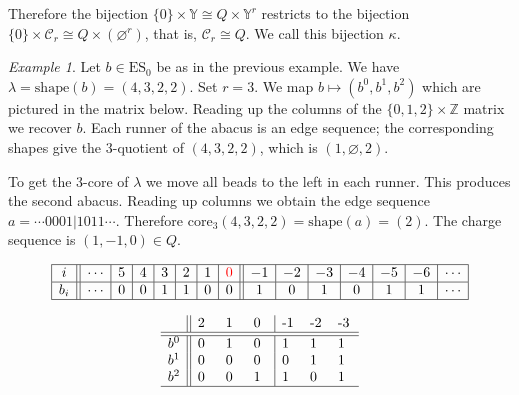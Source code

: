 \documentclass{amsart}
\newcommand{\Z}{\mathbb{Z}}
\newcommand{\Y}{\mathbb{Y}}
\newcommand{\cC}{\mathcal{C}}
\newcommand{\kb}{\kappa}
\newcommand{\la}{\lambda}
\newcommand{\core}{\mathrm{core}}
\newcommand{\ES}{\mathrm{ES}}
\newcommand{\shape}{\mathrm{shape}}
\theoremstyle{remark}
\newtheorem{ex}[thm]{Example}
\numberwithin{thm}{section}
\numberwithin{equation}{section}
\begin{document}
Therefore the bijection $\{0\} \times\Y \cong Q\times\Y^r$ restricts to the bijection
$\{0\} \times \cC_r \cong Q \times (\varnothing^r)$, that is, $\cC_r\cong Q$. We call this bijection $\kb$.

\begin{ex}\label{X:core-quot}
Let $b\in \ES_0$ be as in the previous example. We have $\la=\shape(b)=(4,3,2,2)$. Set $r=3$. 
We map $b\mapsto (b^0,b^1,b^2)$ which are pictured in the matrix below.
Reading up the columns of the $\{0,1,2\}\times \Z$ matrix we recover $b$. 
Each runner of the abacus is an edge sequence; the corresponding shapes give the $3$-quotient of $(4,3,2,2)$, which is
$(1,\varnothing,2)$.

To get the $3$-core of $\la$ we move all beads to the left in each runner. This produces the second abacus. 
Reading up columns we obtain the edge sequence $a=\dotsm 0001|1011\dotsm$. Therefore $\core_3(4,3,2,2)=\shape(a)=(2)$.
The charge sequence is $(1,-1,0)\in Q$. 


\[
\begin{array} {|c||c|c|c|c|c|c|c||c|c|c|c|c|c|c|c|c|c|} \hline
i   &\dotsm  &5&4&3&2&1&{\color{red}{0}}&-1&-2&-3&-4&-5&-6&\dotsm \\ \hline
b_i &\dotsm       &0 &0 & 1& 1& 0&0&1&0&1&0&1&1&\dotsm\\ \hline
\end{array}
\]

\[
\begin{array}{c||p{10pt}p{10pt}p{10pt}|p{10pt}p{10pt}p{10pt}}
   &2&1&0&-1&-2&-3 \\ \hline \hline
b^0& 0&1& 0&1&1&1 \\
b^1& 0&0& 0&0&1&1 \\
b^2& 0&0& 1&1&0&1 \\ \hline
\end{array}
\]


\end{ex}
\end{document}
